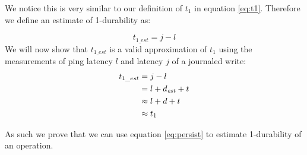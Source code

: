 We notice this is very similar to our definition of $t_1$ in equation \ref{eq:t1}. Therefore we define an estimate of 1-durability as:

\begin{equation} \label{eq:persist}
    t_{1\_est} = j - l
\end{equation}
We will now show that $t_{1\_est}$ is a valid approximation of $t_1$ using the measurements of ping latency $l$ and latency $j$ of a journaled write:
\begin{align*} 
    t_{1\_est} &= j - l \\
    &= l + d_{\text{\textit{est}}} + t \\
    &\approx l + d + t\\
    &\approx t_1
\end{align*}

As such we prove that we can use equation \ref{eq:persist} to estimate 1-durability of an operation.
